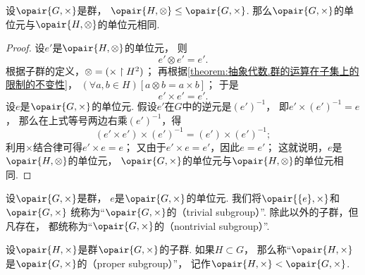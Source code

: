 \begin{proposition}\label{theorem:抽象代数.子群.群的单位元与其子群的单位元相同}
设\(\opair{G,\times}\)是群，
\(\opair{H,\otimes}\AlgebraSubstructure\opair{G,\times}\).
那么\(\opair{G,\times}\)的单位元与\(\opair{H,\otimes}\)的单位元相同.
\begin{proof}
设\(e'\)是\(\opair{H,\otimes}\)的单位元，
则\begin{equation*}
	e' \otimes e' = e'.
\end{equation*}
根据子群的定义，\(\otimes = (\times \upharpoonright H^2)\)；
再根据\cref{theorem:抽象代数.群的运算在子集上的限制的不变性}，
\((\forall a,b \in H)[a \otimes b = a \times b]\)；
于是\begin{equation*}
	e' \times e' = e'.
\end{equation*}
设\(e\)是\(\opair{G,\times}\)的单位元.
假设\(e'\)在\(G\)中的逆元是\((e')^{-1}\)，
即\(e' \times (e')^{-1} = e\)，
那么在上式等号两边右乘\((e')^{-1}\)，得\begin{equation*}
	(e' \times e') \times (e')^{-1} = (e') \times (e')^{-1};
\end{equation*}
利用\(\times\)结合律可得\(e' \times e = e\)；
又由于\(e' \times e = e'\)，因此\(e = e'\)；
这就说明，\(e\)是\(\opair{H,\otimes}\)的单位元，
\(\opair{G,\times}\)的单位元与\(\opair{H,\otimes}\)的单位元相同.
\end{proof}
\end{proposition}

\begin{definition}
设\(\opair{G,\times}\)是群，
\(e\)是\(\opair{G,\times}\)的单位元.
我们将\(\opair{\{e\},\times}\)和\(\opair{G,\times}\)
统称为“\(\opair{G,\times}\)的（trivial subgroup）”.
除此以外的子群，但凡存在，
都统称为“\(\opair{G,\times}\)的（nontrivial subgroup）”.
\end{definition}

\begin{definition}
设\(\opair{H,\times}\)是群\(\opair{G,\times}\)的子群.
如果\(H \subset G\)，
那么称“\(\opair{H,\times}\)是\(\opair{G,\times}\)的（proper subgroup）”，
记作\(\opair{H,\times}\AlgebraProperSubstructure\opair{G,\times}\).
\end{definition}


